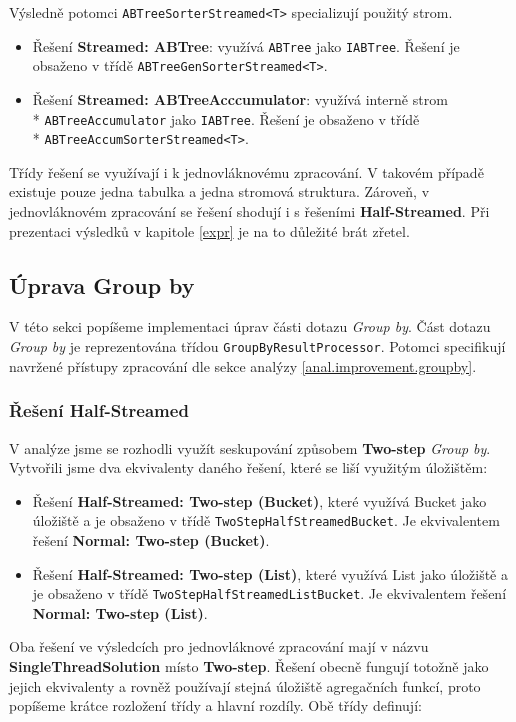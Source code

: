 Výsledně potomci \texttt{ABTreeSorterStreamed<T>} specializují použitý strom.
\begin{itemize}
\item Řešení \textbf{Streamed: ABTree}: využívá \texttt{ABTree} jako \texttt{IABTree}.
Řešení je obsaženo v třídě \texttt{ABTreeGenSorterStreamed<T>}.
\item Řešení \textbf{Streamed: ABTreeAcccumulator}: využívá interně strom\\* \texttt{ABTreeAccumulator} jako \texttt{IABTree}.
Řešení je obsaženo v třídě\\* \texttt{ABTreeAccumSorterStreamed<T>}.
\end{itemize}

Třídy řešení se využívají i k jednovláknovému zpracování.
V takovém případě existuje pouze jedna tabulka a jedna stromová struktura.
Zároveň, v jednovláknovém zpracování se řešení shodují i s řešeními \textbf{Half-Streamed}.
Při prezentaci výsledků v kapitole \ref{expr} je na to důležité brát zřetel.

\subsection{Úprava Group by}

V této sekci popíšeme implementaci úprav části dotazu \textit{Group by}.
Část dotazu \textit{Group by} je reprezentována třídou \texttt{GroupByResultProcessor}.
Potomci specifikují navržené přístupy zpracování dle sekce analýzy \ref{anal.improvement.groupby}.

\subsubsection{Řešení Half-Streamed}

V analýze jsme se rozhodli využít seskupování způsobem \textbf{Two-step} \textit{Group by}.
Vytvořili jsme dva ekvivalenty daného řešení, které se liší využitým úložištěm: 
\begin{itemize}
\item Řešení \textbf{Half-Streamed: Two-step (Bucket)}, které využívá Bucket jako úložiště a je obsaženo v třídě \texttt{TwoStepHalfStreamedBucket}.
Je ekvivalentem řešení \textbf{Normal: Two-step (Bucket)}.
\item Řešení \textbf{Half-Streamed: Two-step (List)}, které využívá List jako úložiště a je obsaženo v třídě \texttt{TwoStepHalfStreamedListBucket}.
Je ekvivalentem řešení \textbf{Normal: Two-step (List)}.
\end{itemize}
Oba řešení ve výsledcích pro jednovláknové zpracování mají v názvu \textbf{SingleThreadSolution} místo \textbf{Two-step}.
Řešení obecně fungují totožně jako jejich ekvivalenty a rovněž používají stejná úložiště agregačních funkcí, proto popíšeme krátce rozložení třídy a hlavní rozdíly.
Obě třídy definují:

